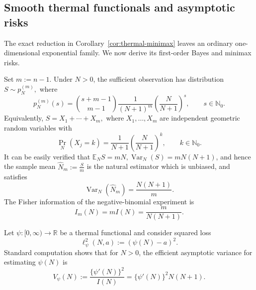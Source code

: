 \documentclass{article}
\theoremstyle{named}
\theoremstyle{named1}
\newcommand{\E}{\mathbb{E}}
\newcommand{\Var}{\operatorname{Var}}
\newcommand{\bbR}{\mathbb R}
\theoremstyle{plain}
\theoremstyle{remark}
\begin{document}
\subsection{Smooth thermal functionals and asymptotic risks}
\label{subsec:thermal-asymptotic-risks}

The exact reduction in Corollary~\ref{cor:thermal-minimax} leaves an
ordinary one-dimensional exponential family. We now derive its
first-order Bayes and minimax risks.

Set
$
    m:=n-1.
$
Under \(N>0\), the sufficient observation has distribution
$S\sim p_N^{(m)},$
where
\begin{equation}
    p_N^{(m)}(s)
    =
    \binom{s+m-1}{m-1}
    \frac{1}{(N+1)^m}
    \left(\frac{N}{N+1}\right)^s,
    \qquad
    s\in\mathbb N_0.
    \label{eq:thermal-negative-binomial-asymptotic}
\end{equation}
Equivalently,
$S=X_1+\cdots+X_m,$
where \(X_1,\ldots,X_m\) are independent geometric random variables with
\begin{equation}
    \Pr_N(X_j=k)
    =
    \frac{1}{N+1}
    \left(\frac{N}{N+1}\right)^k,
    \qquad
    k\in\mathbb N_0.
    \label{eq:thermal-geometric-law}
\end{equation}
It can be easily verified that
$\E_NS=mN,
    \Var_N(S)=mN(N+1)$, 
and hence the sample mean  
$\widehat N_m:=\frac{S}{m}$ 
is the natural estimator which is unbiased, and satisfies
\begin{equation}
    \Var_N(\widehat N_m)
    =
    \frac{N(N+1)}{m}.
    \label{eq:natural-thermal-estimator-variance}
\end{equation}
The Fisher information of the negative-binomial experiment is
\begin{equation}
    I_m(N)
    =
    mI(N)
    =
    \frac{m}{N(N+1)}.
    \label{eq:negative-binomial-fisher-information}
\end{equation}

Let
$\psi:[0,\infty)\rightarrow\bbR$
be a thermal functional and consider squared loss
\begin{equation}
    \ell^2_\psi(N,a)
    :=
    (\psi(N)-a)^2.
    \label{eq:thermal-functional-squared-loss}
\end{equation}
Standard computation shows that for \(N>0\), the efficient asymptotic variance for estimating
\(\psi(N)\) is
\begin{equation}
    V_\psi(N)
    :=
    \frac{\{\psi'(N)\}^2}{I(N)}
    =
    \{\psi'(N)\}^2N(N+1).
    \label{eq:thermal-efficient-variance}
\end{equation}
\end{document}
